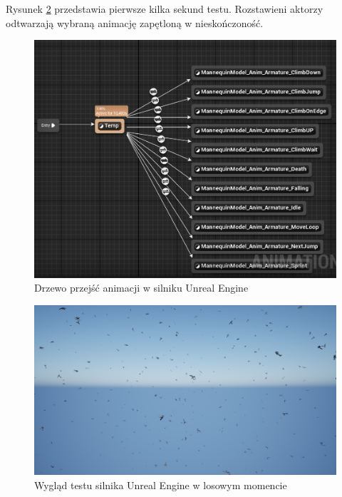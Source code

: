 \documentclass[12pt,twoside]{article}
\begin{document}
Rysunek \ref{Fig:TESTUnrealScreen} przedstawia pierwsze kilka sekund testu.
Rozstawieni aktorzy odtwarzają wybraną animację zapętloną w nieskończoność. 



\begin{figure}[h]
    \centering
    \includegraphics[width=16cm]{figures/UnrealManequin.png}
    \caption{Drzewo przejść animacji w silniku Unreal Engine}
    \label{Fig:UnrealManequin}
\end{figure}     

\begin{figure}[h]
    \centering
    \includegraphics[width=16cm]{figures/UnrealTestScreen.png}
    \caption{Wygląd testu silnika Unreal Engine w losowym momencie}
    \label{Fig:TESTUnrealScreen}
\end{figure}     
\end{document}
